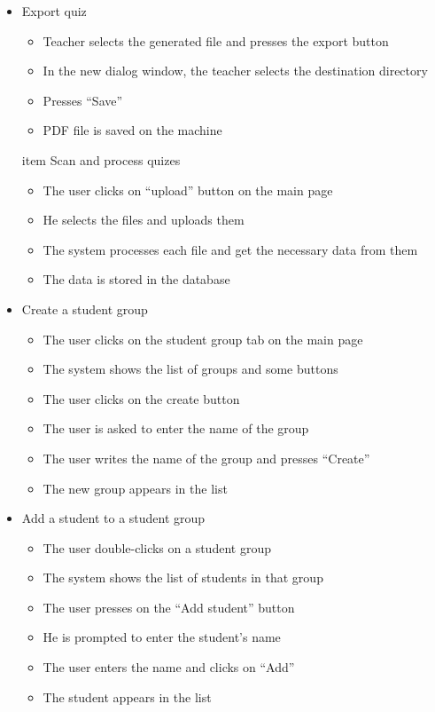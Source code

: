\begin{itemize}
  \item Export quiz
  \begin{itemize}
    \item Teacher selects the generated file and presses the export button
    \item In the new dialog window, the teacher selects the destination directory
    \item Presses “Save”
    \item PDF file is saved on the machine
  \end{itemize}

  item Scan and process quizes
  \begin{itemize}
    \item The user clicks on “upload” button on the main page
    \item He selects the files and uploads them
    \item The system processes each file and get the necessary data from them
    \item The data is stored in the database
  \end{itemize}

  \item Create a student group
  \begin{itemize}
    \item The user clicks on the student group tab on the main page
    \item The system shows the list of groups and some buttons
    \item The user clicks on the create button
    \item The user is asked to enter the name of the group
    \item The user writes the name of the group and presses “Create”
    \item The new group appears in the list
  \end{itemize}

  \item Add a student to a student group
  \begin{itemize}
    \item The user double-clicks on a student group
    \item The system shows the list of students in that group
    \item The user presses on the “Add student” button
    \item He is prompted to enter the student’s name
    \item The user enters the name and clicks on “Add”
    \item The student appears in the list
  \end{itemize}
\end{itemize}

